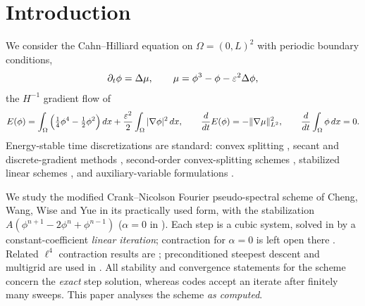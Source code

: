 \section{Introduction}\label{sec:intro}

We consider the Cahn--Hilliard equation \cite{CahnHilliard1958} on $\Omega=(0,L)^2$ with periodic boundary conditions,
\begin{equation}\label{eq:ch}
\partial_t\phi=\Delta\mu,\qquad \mu=\phi^3-\phi-\varepsilon^2\Delta\phi,
\end{equation}
the $H^{-1}$ gradient flow of
\begin{equation}\label{eq:energy}
E(\phi)=\int_\Omega\Big(\tfrac14\phi^4-\tfrac12\phi^2\Big)\,dx+\frac{\varepsilon^2}{2}\int_\Omega|\nabla\phi|^2\,dx,\qquad \frac{d}{dt}E(\phi)=-\lVert \nabla\mu\rVert_{L^2}^2,\qquad \frac{d}{dt}\int_\Omega\phi\,dx=0 .
\end{equation}
Energy-stable time discretizations are standard: convex splitting \cite{Eyre1998}, secant and discrete-gradient methods \cite{DuNicolaides1991,Furihata2001}, second-order convex-splitting schemes \cite{ShenWangWangWise2012,GuanLowengrubWangWise2014,DiegelWangWise2016,ChengWangWiseYue2016}, stabilized linear schemes \cite{FengTangYang2013,LiQiaoTang2016,YanChenWangWise2018,WangYu2018}, and auxiliary-variable formulations \cite{ShenXuYang2018,ShenXuYang2019}.

We study the modified Crank--Nicolson Fourier pseudo-spectral scheme of Cheng, Wang, Wise and Yue \cite{ChengWangWiseYue2016} in its practically used form, with the stabilization $A(\phi^{n+1}-2\phi^n+\phi^{n-1})$ ($\alpha=0$ in \cite{ChengWangWiseYue2016}). Each step is a cubic system, solved in \cite{ChengWangWiseYue2016} by a constant-coefficient \emph{linear iteration}; contraction for $\alpha=0$ is left open there \cite[Remark~2.10]{ChengWangWiseYue2016}. Related $\ell^4$ contraction results are \cite{ZhuGongWang2025,ChenJingLiuWangWang2024}; preconditioned steepest descent and multigrid are used in \cite{FengSalgadoWangWise2017,ChenWangWise2022,GuanLowengrubWangWise2014}. All stability and convergence statements for the scheme concern the \emph{exact} step solution, whereas codes accept an iterate after finitely many sweeps. This paper analyses the scheme \emph{as computed}.

